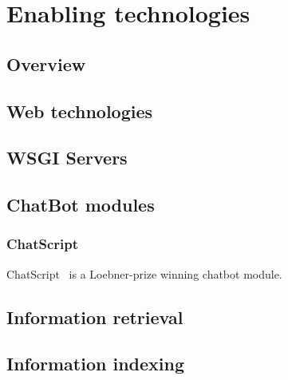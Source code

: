 \chapter{Enabling technologies}
\label{chap:enabling}

\section{Overview}

\section{Web technologies}

\section{WSGI Servers}

\section{ChatBot modules}

\subsection{ChatScript}
\label{subsec:chatscript}

ChatScript~\cite{wilcox2013} is a Loebner-prize winning chatbot module.

\section{Information retrieval}

\section{Information indexing}
